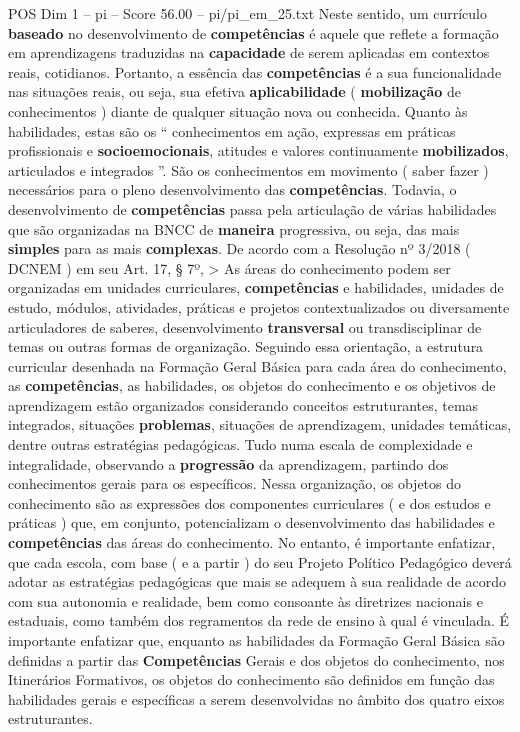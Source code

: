 \begin{textsample}{POS Dim 1 – pi – Score 56.00 – pi/pi\_em\_25.txt}
Neste sentido, um currículo \textbf{baseado} no desenvolvimento de \textbf{competências} é aquele que reflete a formação em aprendizagens traduzidas na \textbf{capacidade} de serem aplicadas em contextos reais, cotidianos.
Portanto, a essência das \textbf{competências} é a sua funcionalidade nas situações reais, ou seja, sua efetiva \textbf{aplicabilidade} ( \textbf{mobilização} de conhecimentos ) diante de qualquer situação nova ou conhecida.
Quanto às habilidades, estas são os “ conhecimentos em ação, expressas em práticas profissionais e \textbf{socioemocionais}, atitudes e valores continuamente \textbf{mobilizados}, articulados e integrados ”.
São os conhecimentos em movimento ( saber fazer ) necessários para o pleno desenvolvimento das \textbf{competências}.
Todavia, o desenvolvimento de \textbf{competências} passa pela articulação de várias habilidades que são organizadas na BNCC de \textbf{maneira} progressiva, ou seja, das mais \textbf{simples} para as mais \textbf{complexas}.
De acordo com a Resolução nº 3/2018 ( DCNEM ) em seu Art. 17, § 7º, > As áreas do conhecimento podem ser organizadas em unidades curriculares, \textbf{competências} e habilidades, unidades de estudo, módulos, atividades, práticas e projetos contextualizados ou diversamente articuladores de saberes, desenvolvimento \textbf{transversal} ou transdisciplinar de temas ou outras formas de organização.
Seguindo essa orientação, a estrutura curricular desenhada na Formação Geral Básica para cada área do conhecimento, as \textbf{competências}, as habilidades, os objetos do conhecimento e os objetivos de aprendizagem estão organizados considerando conceitos estruturantes, temas integrados, situações \textbf{problemas}, situações de aprendizagem, unidades temáticas, dentre outras estratégias pedagógicas.
Tudo numa escala de complexidade e integralidade, observando a \textbf{progressão} da aprendizagem, partindo dos conhecimentos gerais para os específicos.
Nessa organização, os objetos do conhecimento são as expressões dos componentes curriculares ( e dos estudos e práticas ) que, em conjunto, potencializam o desenvolvimento das habilidades e \textbf{competências} das áreas do conhecimento.
No entanto, é importante enfatizar, que cada escola, com base ( e a partir ) do seu Projeto Político Pedagógico deverá adotar as estratégias pedagógicas que mais se adequem à sua realidade de acordo com sua autonomia e realidade, bem como consoante às diretrizes nacionais e estaduais, como também dos regramentos da rede de ensino à qual é vinculada.
É importante enfatizar que, enquanto as habilidades da Formação Geral Básica são definidas a partir das \textbf{Competências} Gerais e dos objetos do conhecimento, nos Itinerários Formativos, os objetos do conhecimento são definidos em função das habilidades gerais e específicas a serem desenvolvidas no âmbito dos quatro eixos estruturantes.

\end{textsample}
